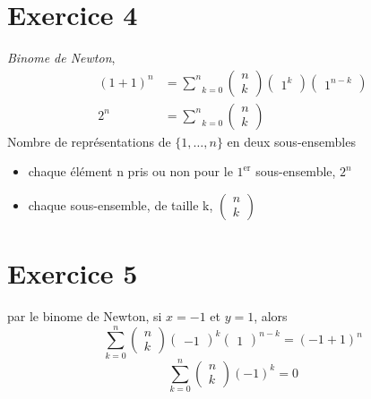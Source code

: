 \documentclass[fontsize=10pt]{article}
\begin{document}
\section*{Exercice 4}
\emph{Binome de Newton},  
\begin{align*}
(1+1)^n &=\underset{k=0}{\overset{n}{\sum}} 
\begin{pmatrix} 
n\\
k
\end{pmatrix}
\begin{pmatrix} 
1^k
\end{pmatrix}
\begin{pmatrix} 
1^{n-k}
\end{pmatrix}\\
2^n&=\underset{k=0}{\overset{n}{\sum}}
\begin{pmatrix} 
n\\
k
\end{pmatrix}
\end{align*}
Nombre de représentations de $\{ 1,\dots,n\}$ en deux sous-ensembles
\begin{itemize}
\item chaque élément n pris ou non pour le $1^{\text{er}}$ sous-ensemble, $2^n$
\item chaque sous-ensemble, de taille k, $
\begin{pmatrix} 
n\\
k
\end{pmatrix}$
\end{itemize}
\section*{Exercice 5}
par le binome de Newton, si $x=-1$ et $y=1$, alors
$$ \underset{k=0}{\overset{n}{\sum}}
\begin{pmatrix} 
n\\
k
\end{pmatrix}
\begin{pmatrix} 
-1
\end{pmatrix}^k
\begin{pmatrix} 
1
\end{pmatrix}^{n-k} = (-1+1)^n$$
$$ \underset{k=0}{\overset{n}{\sum}}
\begin{pmatrix} 
n\\
k
\end{pmatrix}
(-1)^k = 0
$$
\end{document}
